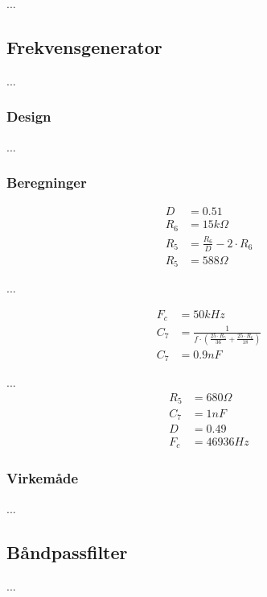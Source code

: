 ...

\subsection{Frekvensgenerator}
...

\subsubsection{Design}
...

\subsubsection{Beregninger}
\begin{equation}
\label{eq:InputsModstand}
\begin{split}
D & = 0.51\\
R_6 & = 15k \Omega \\
R_5 & = \frac{R_6}{D} - 2 \cdot R_6 \\
R_5 & = 588 \Omega 
\end{split}
\end{equation}

... 

\begin{equation}
\label{eq:TriggerKondensator}
\begin{split}
F_c & = 50kHz \\
C_7 & = \frac{1}{f \cdot \left( \frac{25 \cdot R_5 }{36} + \frac{25 \cdot R_6}{18} \right) }\\
C_7 & = 0.9nF
\end{split}
\end{equation}

...
\begin{equation}
\label{eq:TimerTilnaermedeVaerdier}
\begin{split}
R_5 & = 680 \Omega \\
C_7 & = 1nF \\
D & = 0.49 \\
F_c & = 46936Hz
\end{split}
\end{equation}

\subsubsection{Virkemåde}

...

\subsection{Båndpassfilter}
...

